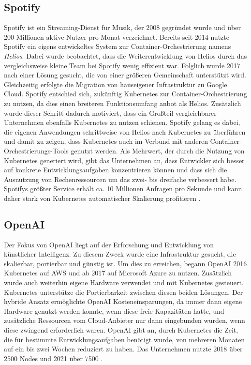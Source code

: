 \documentclass[11pt,a4paper]{article}
\begin{document}
\subsection{Spotify}
Spotify ist ein Streaming-Dienst für Musik, der 2008 gegründet wurde
und über 200 Millionen aktive Nutzer pro Monat verzeichnet.
Bereits seit 2014 nutzte Spotify ein eigens entwickeltes System zur Container-Orchestrierung
namens \emph{Helios}. Dabei wurde beobachtet, dass die Weiterentwicklung von Helios
durch das vergleichsweise kleine Team bei Spotify wenig effizient war.
Folglich wurde 2017 nach einer Lösung gesucht, die von einer größeren Gemeinschaft
unterstützt wird. Gleichzeitig erfolgte die Migration von hauseigener Infrastruktur
zu Google Cloud. Spotify entschied sich, zukünftig Kubernetes zur Container-Orchestrierung zu nutzen,
da dies einen breiteren Funktionsumfang anbot als Helios.
Zusätzlich wurde dieser Schritt dadurch motiviert, dass ein Großteil
vergleichbarer Unternehmen ebenfalls Kubernetes zu nutzen schienen.
Spotify gelang es dabei, die eigenen Anwendungen schrittweise
von Helios nach Kubernetes zu überführen und damit zu zeigen, dass Kubernetes
auch im Verbund mit anderen Container-Orchestrierungs-Tools genutzt werden.
Als Mehrwert, der durch die Nutzung von Kubernetes generiert wird,
gibt das Unternehmen an, dass Entwickler sich besser auf konkrete Entwicklungsaufgaben
konzentrieren können und dass sich die Ausnutzung von Rechenressourcen
um das zwei- bis dreifache verbessert habe.
Spotifys größter Service erhält ca. 10 Millionen Anfragen pro Sekunde
und kann daher stark von Kubernetes automatischer Skalierung profitieren \cite{story_spotify}.

\subsection{OpenAI}
\label{sec:openai}
Der Fokus von OpenAI liegt auf der Erforschung und Entwicklung von künstlicher Intelligenz.
Zu diesem Zweck wurde eine Infrastruktur gesucht, die skalierbar, portierbar und günstig ist.
Um dies zu erreichen, begann \mbox{OpenAI} 2016 Kubernetes auf AWS und ab 2017 auf
Microsoft Azure zu nutzen. Zusätzlich wurde auch weiterhin eigene Hardware verwendet
und mit Kubernetes gesteuert.
Kubernetes unterstütze die Portierbarkeit zwischen diesen beiden Lösungen.
Der hybride Ansatz ermöglichte OpenAI Kosteneinsparungen,
da immer dann eigene Hardware genutzt werden konnte, wenn diese freie Kapazitäten hatte,
und zusätzliche Ressourcen vom Cloud-Anbieter nur dann eingebunden wurden,
wenn diese zwingend erforderlich waren.
OpenAI gibt an, durch Kubernetes die Zeit, die für bestimmte Entwicklungsaufgaben
benötigt wurde, von mehreren Monaten auf ein bis zwei Wochen reduziert zu haben.
Das Unternehmen nutzte 2018 über 2500 Nodes \cite{openai_scaling_2500} und 2021 über 7500 \cite{openai_scaling_7500} \cite{story_openai}.
\end{document}
